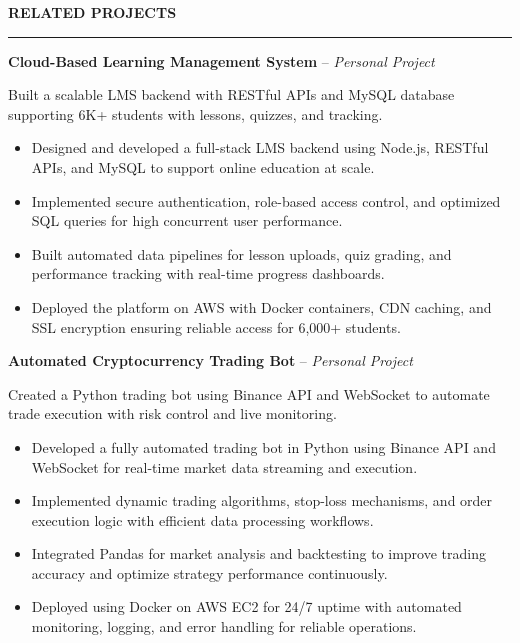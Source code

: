 \documentclass[10pt,letterpaper]{article}
\begin{document}
\vspace{6pt}

\textbf{RELATED PROJECTS}\\[-8pt]
\noindent\rule{\textwidth}{1pt}

\vspace{-2pt}

\textbf{Cloud-Based Learning Management System} -- \emph{Personal Project}

\vspace{-1pt}

Built a scalable LMS backend with RESTful APIs and MySQL database supporting 6K+ students with lessons, quizzes, and tracking.
\vspace{-1pt}
\begin{itemize}
\item Designed and developed a full-stack LMS backend using Node.js, RESTful APIs, and MySQL to support online education at scale.
\item Implemented secure authentication, role-based access control, and optimized SQL queries for high concurrent user performance.
\item Built automated data pipelines for lesson uploads, quiz grading, and performance tracking with real-time progress dashboards.
\item Deployed the platform on AWS with Docker containers, CDN caching, and SSL encryption ensuring reliable access for 6,000+ students.
\end{itemize}

\textbf{Automated Cryptocurrency Trading Bot} -- \emph{Personal Project}

\vspace{-1pt}

Created a Python trading bot using Binance API and WebSocket to automate trade execution with risk control and live monitoring.
\vspace{-1pt}
\begin{itemize}
\item Developed a fully automated trading bot in Python using Binance API and WebSocket for real-time market data streaming and execution.
\item Implemented dynamic trading algorithms, stop-loss mechanisms, and order execution logic with efficient data processing workflows.
\item Integrated Pandas for market analysis and backtesting to improve trading accuracy and optimize strategy performance continuously.
\item Deployed using Docker on AWS EC2 for 24/7 uptime with automated monitoring, logging, and error handling for reliable operations.
\end{itemize}
\end{document}
